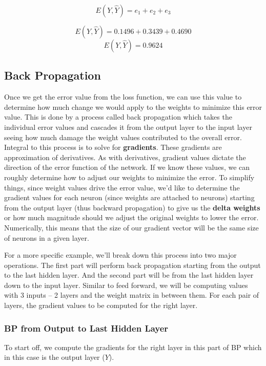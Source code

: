 \documentclass[a4paper]{article}
\begin{document}
\begin{equation}
  E(Y, \widehat{Y})=e_{1} + e_{2} + e_{3}
\end{equation}

\begin{equation}
  E(Y, \widehat{Y})=0.1496 + 0.3439 + 0.4690
\end{equation}
\begin{equation}
  E(Y, \widehat{Y})=0.9624
\end{equation}

\subsection{Back Propagation}

Once we get the error value from the loss function, we can use this value to determine how much change we would apply to the weights to minimize this error value. This is done by a process called back propagation which takes the individual error values and cascades it from the output layer to the input layer seeing how much damage the weight values contributed to the overall error. Integral to this process is to solve for \textbf{gradients}. These gradients are approximation of derivatives. As with derivatives, gradient values dictate the direction of the error function of the network. If we know these values, we can roughly determine how to adjust our weights to minimize the error. To simplify things, since weight values drive the error value, we'd like to determine the gradient values for each neuron (since weights are attached to neurons) starting from the output layer (thus backward propagation) to give us the \textbf{delta weights} or how much magnitude should we adjust the original weights to lower the error. Numerically, this means that the size of our gradient vector will be the same size of neurons in a given layer.

For a more specific example, we'll break down this process into two major operations. The first part will perform back propagation starting from the output to the last hidden layer. And the second part will be from the last hidden layer down to the input layer. Similar to feed forward, we will be computing values with 3 inputs -- 2 layers and the weight matrix in between them. For each pair of layers, the gradient values to be computed for the right layer.

\subsubsection{BP from Output to Last Hidden Layer}
To start off, we compute the gradients for the right layer in this part of BP which in this case is the output layer ($Y$).
\end{document}
